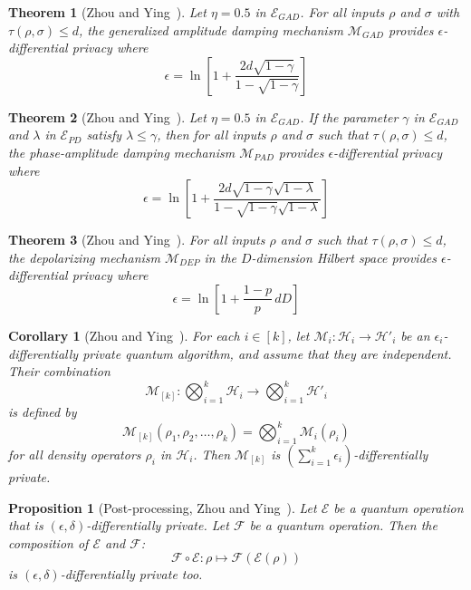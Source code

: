 \documentclass{ieeeaccess}
\newtheorem{theorem}{Theorem}[section]
\newtheorem{proposition}{Proposition}[section]
\newtheorem{corollary}{Corollary}[section]
\begin{document}
\begin{theorem}[Zhou and Ying~\cite{zhou2017differential}]
  Let $\eta = 0.5$ in $\mathcal{E}_{GAD}$. For all inputs $\rho$ and $\sigma$ with $\tau(\rho, \sigma) \leq d$, the generalized amplitude damping mechanism $\mathcal{M}_{GAD}$ provides $\epsilon$-differential privacy where
  \[
    \epsilon = \ln\left[1 + \frac{2d\sqrt{1-\gamma}}{1-\sqrt{1-\gamma}}\right]
  \]
  \label{thm:epsilon_gad}
\end{theorem}

\begin{theorem}[Zhou and Ying~\cite{zhou2017differential}]
  Let $\eta = 0.5$ in $\mathcal{E}_{GAD}$. If the parameter $\gamma$ in $\mathcal{E}_{GAD}$ and $\lambda$ in $\mathcal{E}_{PD}$ satisfy $\lambda \leq \gamma$, then for all inputs $\rho$ and $\sigma$ such that $\tau(\rho, \sigma) \leq d$, the phase-amplitude damping mechanism $\mathcal{M}_{PAD}$ provides $\epsilon$-differential privacy where
  \[
    \epsilon = \ln\left[1 + \frac{2d\sqrt{1-\gamma}\sqrt{1-\lambda}}{1-\sqrt{1-\gamma}\sqrt{1-\lambda}}\right]
  \]
  \label{thm:epsilon_pad}
\end{theorem}

\begin{theorem}[Zhou and Ying~\cite{zhou2017differential}]
  For all inputs $\rho$ and $\sigma$ such that $\tau(\rho, \sigma) \leq d$, the depolarizing mechanism $\mathcal{M}_{DEP}$ in the $D$-dimension Hilbert space provides $\epsilon$-differential privacy where
  \[
    \epsilon = \ln\left[1 + \frac{1-p}{p}\, dD\right]
  \]
  \label{thm:epsilon_dep}
\end{theorem}

\begin{corollary}[Zhou and Ying~\cite{zhou2017differential}]
  For each $i \in [k]$, let $\mathcal{M}_i : \mathcal{H}_i \to \mathcal{H}'_i$ be an $\epsilon_i$-differentially private quantum algorithm, and assume that they are independent. Their combination
  \[
    \mathcal{M}_{[k]} : \bigotimes_{i=1}^{k} \mathcal{H}_i \to \bigotimes_{i=1}^{k} \mathcal{H}'_i
  \]
  is defined by
  \[
    \mathcal{M}_{[k]}(\rho_1, \rho_2, \dots, \rho_k) = \bigotimes_{i=1}^{k} \mathcal{M}_i(\rho_i)
  \]
  for all density operators $\rho_i$ in $\mathcal{H}_i$. Then $\mathcal{M}_{[k]}$ is $\left(\sum_{i=1}^{k} \epsilon_i\right)$-differentially private.
  \label{cor:composition}
\end{corollary}

\begin{proposition}[Post-processing, Zhou and Ying~\cite{zhou2017differential}]
  Let $\mathcal{E}$ be a quantum operation that is $(\epsilon, \delta)$-differentially private. Let $\mathcal{F}$ be a quantum operation. Then the composition of $\mathcal{E}$ and $\mathcal{F}$:
  \[
    \mathcal{F} \circ \mathcal{E} : \rho \mapsto \mathcal{F}(\mathcal{E}(\rho))
  \]
  is $(\epsilon, \delta)$-differentially private too.
  \label{prop:post_processing}
\end{proposition}
\end{document}
